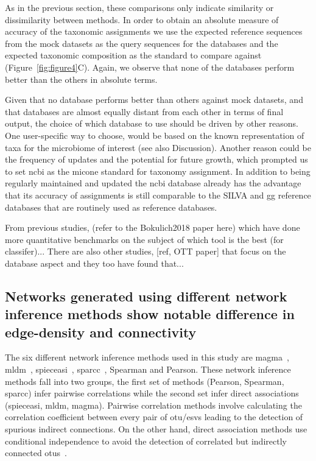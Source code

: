   As in the previous section, these comparisons only indicate similarity or dissimilarity between methods.
  In order to obtain an absolute measure of accuracy of the taxonomic assignments we use the expected reference sequences from the mock datasets as the query sequences for the databases and the expected taxonomic composition as the standard to compare against (Figure~\ref{fig:figure4}C).
  Again, we observe that none of the databases perform better than the others in absolute terms.

  Given that no database performs better than others against mock datasets, and that databases are almost equally distant from each other in terms of final output, the choice of which database to use should be driven by other reasons.
  One user-specific way to choose, would be based on the known representation of taxa for the microbiome of interest (see also Discussion). Another reason could be the frequency of updates and the potential for future growth, which prompted us to set \ac{ncbi} as the \ac{micone} standard for taxonomy assignment.
 In addition to being regularly maintained and updated the \ac{ncbi} database already has the advantage that its accuracy of assignments is still comparable to the SILVA and \ac{gg} reference databases that are routinely used as reference databases.

 From previous studies, (refer to the Bokulich2018 paper here) which have done more quantitative benchmarks on the subject of which tool is the best (for classifer)...
 There are also other studies, [ref, OTT paper] that focus on the database aspect and they too have found that...

  \FloatBarrier

  \subsection*{Networks generated using different network inference methods show notable difference in edge-density and connectivity}

  The six different network inference methods used in this study are \ac{magma}~\cite{Cougoul2019}, \ac{mldm}~\cite{Yang2017}, \ac{spieceasi}~\cite{Kurtz2015}, \ac{sparcc}~\cite{Friedman2012}, Spearman and Pearson.
  These network inference methods fall into two groups, the first set of methods (Pearson, Spearman, \ac{sparcc}) infer pairwise correlations while the second set infer direct associations (\ac{spieceasi}, \ac{mldm}, \ac{magma}).
  Pairwise correlation methods involve calculating the correlation coefficient between every pair of \ac{otu}/\ac{esv}s leading to the detection of spurious indirect connections.
  On the other hand, direct association methods use conditional independence to avoid the detection of correlated but indirectly connected \ac{otu}s~\cite{Kurtz2015,Menon2018}.

